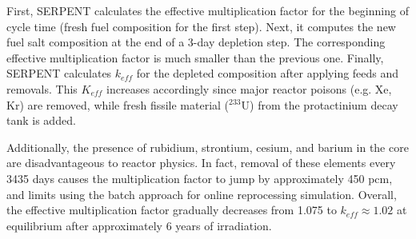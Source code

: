 First, SERPENT calculates the effective multiplication factor for the beginning 
of cycle time (fresh fuel composition for the first step). Next, it computes 
the new fuel salt composition at the end of a 3-day depletion step. The 
corresponding effective multiplication factor is much smaller than the previous 
one. Finally, SERPENT calculates $k_{eff}$ for the depleted composition after 
applying feeds and removals. This $K_{eff}$ increases accordingly since major reactor 
poisons (e.g. Xe, Kr) are removed, while fresh fissile material ($^{233}$U) 
from the protactinium decay tank is added.  

Additionally, the presence of rubidium, strontium, cesium, and barium in the 
core are disadvantageous to reactor physics. In fact, removal of these elements 
every 3435 days causes the multiplication factor to jump by approximately 450 
pcm, and limits using the batch approach for online reprocessing simulation. 
Overall, the effective multiplication factor gradually decreases from 1.075 to 
$k_{eff} \approx 1.02$ at equilibrium after approximately 6 years of 
irradiation. 

